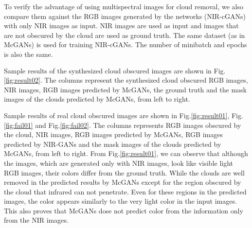 \documentclass[10pt,twocolumn,letterpaper]{article}
\begin{document}
To verify the advantage of using multispectral images for cloud removal, we also compare them against the RGB images generated by the networks (NIR-cGANs) with only NIR images as input. NIR images are used as input and images that are not obscured by the cloud are used as ground truth. The same dataset (as in McGANs) is used for training  NIR-cGANs. The number of minibatch and epochs is also the same.

Sample results of the synthesized cloud obscured images are shown in Fig.\ref{fig:result02}. The columns represent the synthesized cloud obscured RGB images, NIR images, RGB images predicted by McGANs, the ground truth and the mask images of the clouds predicted by McGANs, from left to right.

Sample results of real cloud obscured images are shown in Fig.\ref{fig:result01}, Fig.\ref{fig:fail01} and Fig.\ref{fig:fail02}. The columns represents RGB images obscured by the cloud, NIR images, RGB images predicted by McGANs, RGB images predicted by NIR-GANs and the mask images of the clouds predicted by McGANs, from left to right.
From Fig.\ref{fig:result01}, we can observe that although the images, which are generated  only with NIR images, look like visible light RGB images, their colors differ from the ground truth.
While the clouds are well removed in the predicted results by McGANs except for the region obscured by the cloud that infrared can not penetrate. Even for these regions in the predicted images, the color appears similarly to the very light color in the input images. This also proves that McGANs dose not predict color from the information only  from the NIR images.
\end{document}
